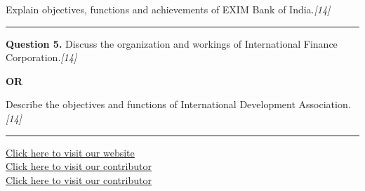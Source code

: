 \documentclass[11pt,a4paper]{article}
\newcommand{\pts}[1]{\hfill   \textit{[#1]}}
\begin{document}
Explain objectives, functions and achievements of EXIM Bank of India.\pts{14}

\medskip\rule{\linewidth}{0.2pt}




\noindent   \textbf{Question 5.}
Discuss the organization and workings of International Finance Corporation.\pts{14}

\centerline{   \textbf{OR}}

Describe the objectives and functions of International Development Association.\pts{14}

\vfill
\rule{\linewidth}{0.4pt}

\begin{center}\small
\href{https://bhu-exam.vercel.app/}{Click here to visit our website}\\[4pt]
\href{https://me-aryan.vercel.app/}{Click here to visit our contributor}\\[4pt]
\href{https://quashan-me.vercel.app/}{Click here to visit our contributor}
\end{center}
\end{document}
